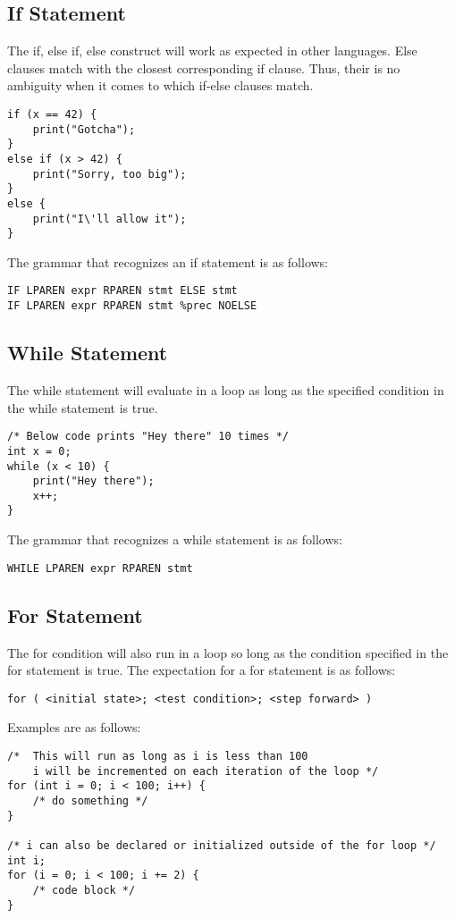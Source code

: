 \documentclass{article}
\begin{document}
\subsection{If Statement}
The if, else if, else construct will work as expected in other languages. Else clauses match with the closest corresponding if clause. Thus, their is no ambiguity when it comes to which if-else clauses match.

\begin{lstlisting}
if (x == 42) {
	print("Gotcha");
}
else if (x > 42) {
	print("Sorry, too big");
}
else {
	print("I\'ll allow it");
}
\end{lstlisting}

The grammar that recognizes an if statement is as follows:
\begin{Verbatim}[frame=single]
IF LPAREN expr RPAREN stmt ELSE stmt
IF LPAREN expr RPAREN stmt %prec NOELSE
\end{Verbatim}

\subsection{While Statement}
The while statement will evaluate in a loop as long as the specified condition in the while statement is true.

\begin{lstlisting}
/* Below code prints "Hey there" 10 times */
int x = 0;
while (x < 10) {
	print("Hey there");
	x++;
}
\end{lstlisting}

The grammar that recognizes a while statement is as follows:
\begin{Verbatim}[frame=single]
WHILE LPAREN expr RPAREN stmt
\end{Verbatim}

\subsection{For Statement}
The for condition will also run in a loop so long as the condition specified in the for statement is true.  The expectation for a for statement is as follows:

\texttt{for ( <initial state>; <test condition>; <step forward> )}

Examples are as follows:

\begin{lstlisting}
/* 	This will run as long as i is less than 100
	i will be incremented on each iteration of the loop */
for (int i = 0; i < 100; i++) {
	/* do something */
}

/* i can also be declared or initialized outside of the for loop */
int i;
for (i = 0; i < 100; i += 2) {
	/* code block */
}
\end{lstlisting}
\end{document}
